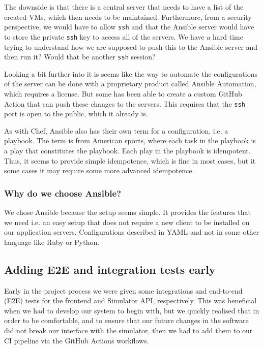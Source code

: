 The downside is that there is a central server that needs to have a list of the created VMs, which then needs to be maintained. Furthermore, from a security perspective, we would have to allow \texttt{ssh} and that the Ansible server would have to store the private \texttt{ssh} key to access all of the servers. We have a hard time trying to understand how we are supposed to push this to the Ansible server and then run it? Would that be another \texttt{ssh} session?

Looking a bit further into it is seems like the way to automate the configurations of the server can be done with a proprietary product called Ansible Automation, which requires a license. But some has been able to create a custom GitHub Action that can push these changes to the servers. This requires that the \texttt{ssh} port is open to the public, which it already is.

As with Chef, Ansible also has their own term for a configuration, i.e. a playbook. The term is from American sports, where each task in the playbook is a play that constitutes the playbook. Each play in the playbook is idempotent. Thus, it seems to provide simple idempotence, which is fine in most cases, but it some cases it may require some more advanced idempotence.

\subsubsection{Why do we choose Ansible?}

We chose Ansible because the setup seems simple. It provides the features that we need i.e. an easy setup that does not require a new client to be installed on our application servers. Configurations described in YAML and not in some other language like Ruby or Python.

\subsection{Adding E2E and integration tests early}

Early in the project process we were given some integrations and end-to-end (E2E) tests for the frontend and Simulator API, respectively. This was beneficial when we had to develop our system to begin with, but we quickly realised that in order to be comfortable, and to ensure that our future changes in the software did not break our interface with the simulator, then we had to add them to our CI pipeline via the GitHub Actions workflows.

